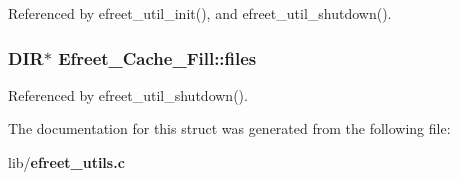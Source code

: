 Referenced by efreet\_\-util\_\-init(), and efreet\_\-util\_\-shutdown().
\subsubsection{\setlength{\rightskip}{0pt plus 5cm}DIR$\ast$ {\bf Efreet\_\-Cache\_\-Fill::files}}\label{structEfreet__Cache__Fill_9d52cafe84aaa951a15147a2b32bf30b}




Referenced by efreet\_\-util\_\-shutdown().

The documentation for this struct was generated from the following file:\begin{CompactItemize}
\item 
lib/{\bf efreet\_\-utils.c}\end{CompactItemize}

